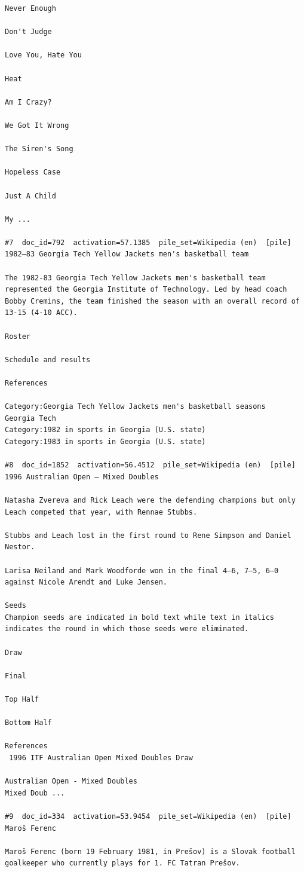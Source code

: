 \begin{verbatim}
Never Enough

Don't Judge

Love You, Hate You

Heat

Am I Crazy?

We Got It Wrong

The Siren's Song

Hopeless Case

Just A Child

My ...

#7  doc_id=792  activation=57.1385  pile_set=Wikipedia (en)  [pile]
1982–83 Georgia Tech Yellow Jackets men's basketball team

The 1982-83 Georgia Tech Yellow Jackets men's basketball team represented the Georgia Institute of Technology. Led by head coach Bobby Cremins, the team finished the season with an overall record of 13-15 (4-10 ACC).

Roster

Schedule and results

References 

Category:Georgia Tech Yellow Jackets men's basketball seasons
Georgia Tech
Category:1982 in sports in Georgia (U.S. state)
Category:1983 in sports in Georgia (U.S. state)

#8  doc_id=1852  activation=56.4512  pile_set=Wikipedia (en)  [pile]
1996 Australian Open – Mixed Doubles

Natasha Zvereva and Rick Leach were the defending champions but only Leach competed that year, with Rennae Stubbs.

Stubbs and Leach lost in the first round to Rene Simpson and Daniel Nestor.

Larisa Neiland and Mark Woodforde won in the final 4–6, 7–5, 6–0 against Nicole Arendt and Luke Jensen.

Seeds
Champion seeds are indicated in bold text while text in italics indicates the round in which those seeds were eliminated.

Draw

Final

Top Half

Bottom Half

References
 1996 ITF Australian Open Mixed Doubles Draw

Australian Open - Mixed Doubles
Mixed Doub ...

#9  doc_id=334  activation=53.9454  pile_set=Wikipedia (en)  [pile]
Maroš Ferenc

Maroš Ferenc (born 19 February 1981, in Prešov) is a Slovak football goalkeeper who currently plays for 1. FC Tatran Prešov.


\end{verbatim}

